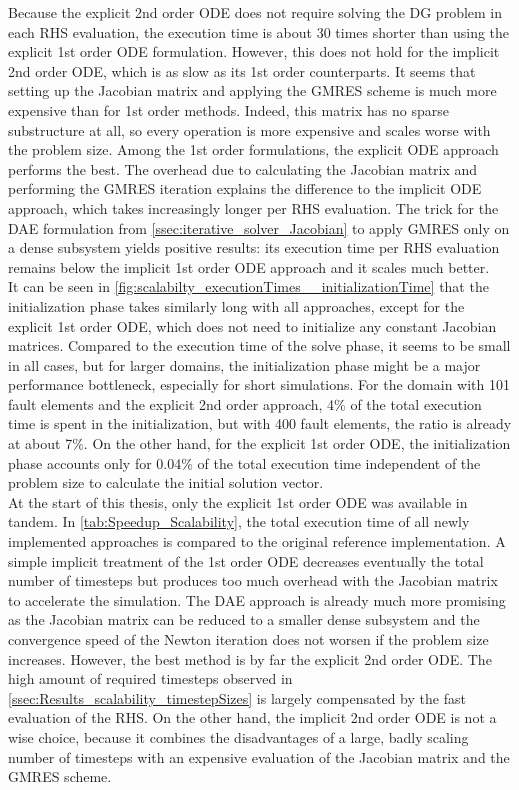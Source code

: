 Because the explicit 2nd order ODE does not require solving the DG problem in each RHS evaluation, the execution time is about 30 times shorter than using the explicit 1st order ODE formulation. However, this does not hold for the implicit 2nd order ODE, which is as slow as its 1st order counterparts. It seems that setting up the Jacobian matrix and applying the GMRES scheme is much more expensive than for 1st order methods. Indeed, this matrix has no sparse substructure at all, so every operation is more expensive and scales worse with the problem size. Among the 1st order formulations, the explicit ODE approach performs the best. The overhead due to calculating the Jacobian matrix and performing the GMRES iteration explains the difference to the implicit ODE approach, which takes increasingly longer per RHS evaluation. The trick for the DAE formulation from \autoref{ssec:iterative_solver_Jacobian} to apply GMRES only on a dense subsystem yields positive results: its execution time per RHS evaluation remains below the implicit 1st order ODE approach and it scales much better. \\
It can be seen in \autoref{fig:scalabilty_executionTimes__initializationTime} that the initialization phase takes similarly long with all approaches, except for the explicit 1st order ODE, which does not need to initialize any constant Jacobian matrices. Compared to the execution time of the solve phase, it seems to be small in all cases, but for larger domains, the initialization phase might be a major performance bottleneck, especially for short simulations. For the domain with 101 fault elements and the explicit 2nd order approach, 4\% of the total execution time is spent in the initialization, but with 400 fault elements, the ratio is already at about 7\%. On the other hand, for the explicit 1st order ODE, the initialization phase accounts only for 0.04\% of the total execution time independent of the problem size to calculate the initial solution vector. \\
At the start of this thesis, only the explicit 1st order ODE was available in {\ttfamily tandem}. In \autoref{tab:Speedup_Scalability}, the total execution time of all newly implemented approaches is compared to the original reference implementation. A simple implicit treatment of the 1st order ODE decreases eventually the total number of timesteps but produces too much overhead with the Jacobian matrix to accelerate the simulation. The DAE approach is already much more promising as the Jacobian matrix can be reduced to a smaller dense subsystem and the convergence speed of the Newton iteration does not worsen if the problem size increases. However, the best method is by far the explicit 2nd order ODE. The high amount of required timesteps observed in \autoref{ssec:Results_scalability_timestepSizes} is largely compensated by the fast evaluation of the RHS. On the other hand, the implicit 2nd order ODE is not a wise choice, because it combines the disadvantages of a large, badly scaling number of timesteps with an expensive evaluation of the Jacobian matrix and the GMRES scheme. \\

